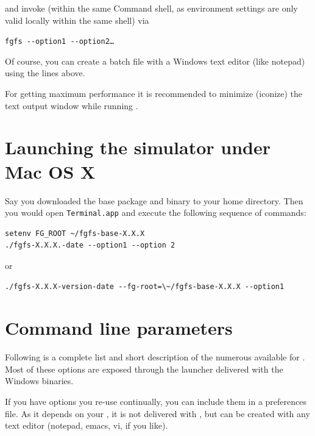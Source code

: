 \noindent
 and invoke \FlightGear{} (within the same Command shell, as environment
 settings are only valid locally within the same shell) via
\medskip

\texttt{fgfs -$ $-option1 -$ $-option2\dots}
\medskip

Of course, you can create a batch file with a Windows text editor (like notepad)
using the lines above.

For getting maximum performance it is recommended to minimize (iconize) the
text output window while running \FlightGear{}.

\section{Launching the simulator under Mac OS X}
Say you downloaded the base package and binary to your home directory. Then you would open \texttt{Terminal.app} and execute the following sequence of commands:
\medskip

\begin{verbatim}
setenv FG_ROOT ~/fgfs-base-X.X.X
./fgfs-X.X.X.-date --option1 --option 2
\end{verbatim}

\noindent
or
\medskip

\begin{verbatim}
./fgfs-X.X.X-version-date --fg-root=\~/fgfs-base-X.X.X --option1
\end{verbatim}

\section{Command line parameters\label{options}}
Following is a complete list and short description of the numerous 
available for \FlightGear{}. Most of these options are exposed through the \FlightGear{} launcher delivered with the
Windows binaries.

If you have options you re-use continually, you can include them in a preferences file. As it depends on your
, it is not delivered with \FlightGear{}, but can be created with any text editor (notepad, emacs, vi, if you like).

